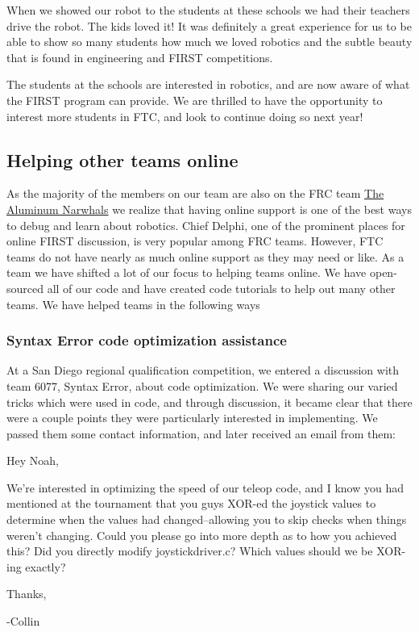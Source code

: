 When we showed our robot to the students at these schools we had their teachers drive the robot. The kids loved it! It was definitely a great experience for us to be able to show so many students how much we loved robotics and the subtle beauty that is found in engineering and FIRST competitions. 

The students at the schools are interested in robotics, and are now aware of what the FIRST program can provide. We are thrilled to have the opportunity to interest more students in FTC, and look to continue doing so next year!

\subsection{Helping other teams online}
As the majority of the members on our team are also on the FRC team \underline{The Aluminum Narwhals} we realize that having online support is one of the best ways to debug and learn about robotics. Chief Delphi, one of the prominent places for online FIRST discussion, is very popular among FRC teams. However, FTC teams do not have nearly as much online support as they may need or like. As a team we have shifted a lot of our focus to helping teams online. We have open-sourced all of our code and have created code tutorials to help out many other teams. We have helped teams in the following ways

\subsubsection{Syntax Error code optimization assistance}

At a San Diego regional qualification competition, we entered a discussion with team 6077, Syntax Error, about code optimization. We were sharing our varied tricks which were used in code, and through discussion, it became clear that there were a couple points they were particularly interested in implementing. We passed them some contact information, and later received an email from them:

\begin{fancyquotes}
Hey Noah,

We're interested in optimizing the speed of our teleop code, and I know you had mentioned at the tournament that you guys XOR-ed the joystick values to determine when the values had changed--allowing you to skip checks when things weren't changing. Could you please go into more depth as to how you achieved this? Did you directly modify joystickdriver.c? Which values should we be XOR-ing exactly?

Thanks,

-Collin 
\end{fancyquotes}

